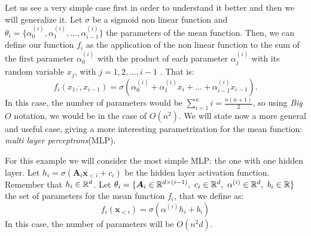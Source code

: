 Let us see a very simple case first in order to understand it better and then we will generalize it. Let $\sigma$ be a sigmoid non linear function and 
$\theta_i = \{\alpha_{0}^{(i)},\alpha_{1}^{(i)},\dots, \alpha_{i-1}^{(i)}\}$ the parameters of the mean function. Then, we can define our function $f_i$ as the application of the non linear function to the
sum of the first parameter $\alpha_0^{(i)}$ with the product of each parameter $\alpha_{j}^{(i)}$ with its random variable $x_j$, with $j =1,2,\dots,i-1$ .  That is:
$$
f_i(x_1,\dot, x_{i-1}) = \sigma(\alpha_{0}^{(i)} + \alpha_{1}^{(i)}x_i + \dots + \alpha_{i-1}^{(i)}x_{i-1}).
$$
In this case, the number of parameters would be $\sum_{i = 1}^n i = \frac{n(n+1)}{2}$, so using \emph{Big }$O$ notation, we would be in the case of $O(n^2)$. We will state now a more general and useful case,
giving a more interesting parametrization for the mean function: \emph{multi layer perceptrons}\footnotemark (MLP).


For this example we will consider the most simple MLP: the one with one hidden layer. Let $h_i = \sigma(\bm{A}_i \bm{x}_{<i} + c_i)$ be the hidden layer activation function. Remember that $h_i \in \mathbb{R}^d$. Let
$ \theta_i = \{ \bm{A}_i \in \R^{d \times (i-1)}, \ c_i \in \R^d, \ \alpha^{(i)} \in \R^d, \ b_i \in \R\}$ the set of parameters
for the mean function $f_i$, that we define as:
$$
f_i(\bm{x}_{<i}) = \sigma(\alpha^{(i)}h_i + b_i)
$$
In this case, the number of parameters will be $O(n^2 d)$.
